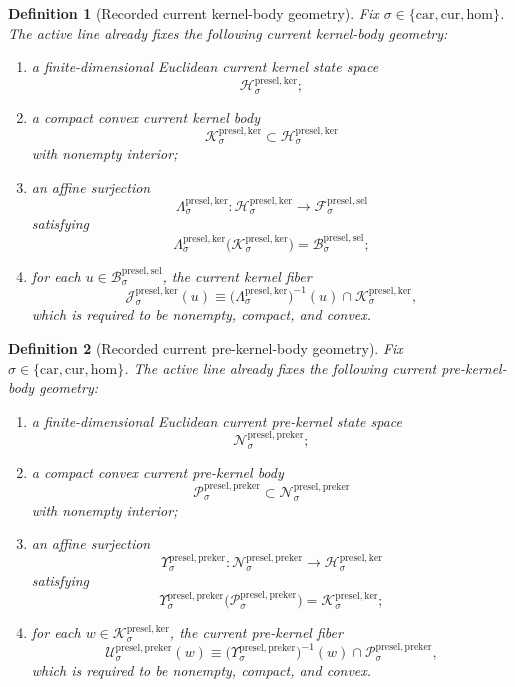 \documentclass[11pt]{article}
\newcommand{\Car}{\mathrm{car}}
\newcommand{\Cur}{\mathrm{cur}}
\newcommand{\Hom}{\mathrm{hom}}
\newcommand{\PreSectionSelectorSpace}[1]{\mathcal F_{#1}^{\mathrm{presel,sel}}}
\newcommand{\PreSectionSelectorBody}[1]{\mathcal B_{#1}^{\mathrm{presel,sel}}}
\newcommand{\KernelSpace}[1]{\mathcal H_{#1}^{\mathrm{presel,ker}}}
\newcommand{\KernelBody}[1]{\mathcal K_{#1}^{\mathrm{presel,ker}}}
\newcommand{\KernelProj}[1]{\Lambda_{#1}^{\mathrm{presel,ker}}}
\newcommand{\KernelFiber}[2]{\mathcal J_{#1}^{\mathrm{presel,ker}}(#2)}
\newcommand{\PreKernelSpace}[1]{\mathcal N_{#1}^{\mathrm{presel,preker}}}
\newcommand{\PreKernelBody}[1]{\mathcal P_{#1}^{\mathrm{presel,preker}}}
\newcommand{\PreKernelProj}[1]{\Upsilon_{#1}^{\mathrm{presel,preker}}}
\newcommand{\PreKernelFiber}[2]{\mathcal U_{#1}^{\mathrm{presel,preker}}(#2)}
\newtheorem{definition}{Definition}
\begin{document}
\begin{definition}[Recorded current kernel-body geometry]
\label{def:kernelgeometry}
Fix \(\sigma\in\{\Car,\Cur,\Hom\}\). The active line already fixes the following current kernel-body geometry:
\begin{enumerate}
    \item a finite-dimensional Euclidean current kernel state space
    \[
    \KernelSpace{\sigma};
    \]
    \item a compact convex current kernel body
    \[
    \KernelBody{\sigma}\subset\KernelSpace{\sigma}
    \]
    with nonempty interior;
    \item an affine surjection
    \[
    \KernelProj{\sigma}:\KernelSpace{\sigma}\to\PreSectionSelectorSpace{\sigma}
    \]
    satisfying
    \[
    \KernelProj{\sigma}\bigl(\KernelBody{\sigma}\bigr)=\PreSectionSelectorBody{\sigma};
    \]
    \item for each \(u\in\PreSectionSelectorBody{\sigma}\), the current kernel fiber
    \[
    \KernelFiber{\sigma}{u}
    \equiv
    \bigl(\KernelProj{\sigma}\bigr)^{-1}(u)\cap\KernelBody{\sigma},
    \]
    which is required to be nonempty, compact, and convex.
\end{enumerate}
\end{definition}

\begin{definition}[Recorded current pre-kernel-body geometry]
\label{def:prekernelgeometry}
Fix \(\sigma\in\{\Car,\Cur,\Hom\}\). The active line already fixes the following current pre-kernel-body geometry:
\begin{enumerate}
    \item a finite-dimensional Euclidean current pre-kernel state space
    \[
    \PreKernelSpace{\sigma};
    \]
    \item a compact convex current pre-kernel body
    \[
    \PreKernelBody{\sigma}\subset\PreKernelSpace{\sigma}
    \]
    with nonempty interior;
    \item an affine surjection
    \[
    \PreKernelProj{\sigma}:\PreKernelSpace{\sigma}\to\KernelSpace{\sigma}
    \]
    satisfying
    \[
    \PreKernelProj{\sigma}\bigl(\PreKernelBody{\sigma}\bigr)=\KernelBody{\sigma};
    \]
    \item for each \(w\in\KernelBody{\sigma}\), the current pre-kernel fiber
    \[
    \PreKernelFiber{\sigma}{w}
    \equiv
    \bigl(\PreKernelProj{\sigma}\bigr)^{-1}(w)\cap\PreKernelBody{\sigma},
    \]
    which is required to be nonempty, compact, and convex.
\end{enumerate}
\end{definition}
\end{document}
